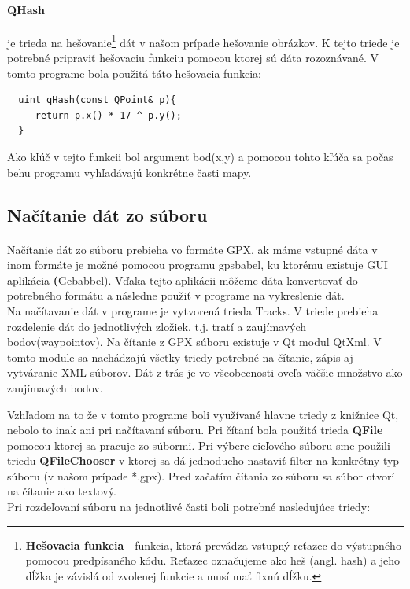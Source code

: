 \paragraph{QHash} je trieda na hešovanie\footnote{\textbf{Hešovacia funkcia} - funkcia, ktorá prevádza vstupný reťazec do výstupného pomocou predpísaného kódu. Reťazec označujeme ako heš (angl. hash) a jeho dĺžka je závislá od zvolenej funkcie a musí mať fixnú dĺžku.} dát v našom prípade hešovanie obrázkov. K tejto triede je potrebné pripraviť hešovaciu funkciu pomocou ktorej sú dáta rozoznávané.
V tomto programe bola použitá táto hešovacia funkcia:
\begin{verbatim}
  uint qHash(const QPoint& p){
     return p.x() * 17 ^ p.y();
  }
\end{verbatim}

Ako kľúč v tejto funkcii bol argument bod(x,y) a pomocou tohto kľúča sa počas behu programu vyhľadávajú konkrétne časti mapy.

\subsection{Načítanie dát zo súboru}
\paragraph{}
Načítanie dát zo súboru prebieha vo formáte GPX, ak máme vstupné dáta v inom formáte je možné pomocou programu gpsbabel, ku ktorému existuje GUI aplikácia \textbf(Gebabbel). Vďaka tejto aplikácii môžeme dáta konvertovať do potrebného formátu a následne použiť v programe na vykreslenie dát.\\ 
Na načítavanie dát v programe je vytvorená trieda Tracks. V triede prebieha rozdelenie dát do jednotlivých zložiek, t.j. tratí a zaujímavých bodov(waypointov). Na čítanie z GPX súboru existuje v Qt modul QtXml. V tomto module sa nachádzajú všetky triedy potrebné na čítanie, zápis aj vytváranie XML súborov. Dát z trás je vo všeobecnosti oveľa väčšie množstvo ako zaujímavých bodov.  

Vzhľadom na to že v tomto programe boli využívané hlavne triedy z knižnice Qt, nebolo to inak ani pri načítavaní súboru. 
Pri čítaní bola použitá trieda \textbf{QFile} pomocou ktorej sa pracuje zo súbormi. Pri výbere cieľového súboru sme použili triedu \textbf{QFileChooser} v ktorej sa dá jednoducho nastaviť filter na konkrétny typ súboru (v našom prípade *.gpx). Pred začatím čítania zo súboru sa súbor otvorí na čítanie ako textový. \\
Pri rozdeľovaní súboru na jednotlivé časti boli potrebné nasledujúce triedy:
